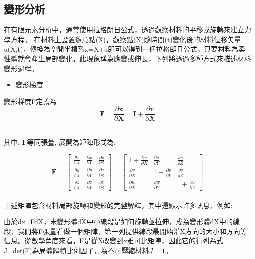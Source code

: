 \subsection{變形分析}

在有限元素分析中，通常使用拉格朗日公式，透過觀察材料的平移或旋轉來建立力學方程。
在材料上設置隨意點(X)，觀察點(X)隨時間(t)變化後的材料位移矢量u(X,t)，轉換為空間坐標系x=X+u即可以得到一個拉格朗日公式，只要材料為柔性體就會產生局部變化，此現象稱為應變或伸長，下列將透過多種方式來描述材料變形過程。\\

\begin{itemize}
\item 變形梯度
\end{itemize}

變形梯度F定義為
$$\mathbf{F}=\frac{\partial \mathbf{x}}{\partial \mathbf{X}}=\mathbf{I}+\frac{\partial \mathbf{u}}{\partial \mathbf{X}}$$\

其中, $\mathbf{I}$ 等同張量, 展開為矩陣形式為:\

$$\mathbf{F}=\left[\begin{array}{lll}
\frac{\partial x}{\partial X} & \frac{\partial x}{\partial Y} & \frac{\partial x}{\partial Z} \\
\frac{\partial y}{\partial X} & \frac{\partial y}{\partial Y} & \frac{\partial y}{\partial Z} \\
\frac{\partial z}{\partial X} & \frac{\partial z}{\partial Y} & \frac{\partial z}{\partial Z}
\end{array}\right]=\left[\begin{array}{ccc}
1+\frac{\partial u}{\partial X} & \frac{\partial u}{\partial Y} & \frac{\partial u}{\partial Z} \\
\frac{\partial v}{\partial X} & 1+\frac{\partial v}{\partial Y} & \frac{\partial v}{\partial Z} \\
\frac{\partial w}{\partial X} & \frac{\partial w}{\partial Y} & 1+\frac{\partial w}{\partial Z}
\end{array}\right]$$
\\

上述矩陣包含材料局部旋轉和變形的完整解釋，其中還顯示許多訊息，例如:\

由於dx=FdX，未變形體dX中小線段是如何旋轉並拉伸，成為變形體dX中的線段，我們將F張量看做一個矩陣，第一列提供線段最開始沿X方向的大小和方向等信息。從數學角度來看，F是從X改變到x雅可比矩陣，因此它的行列為式J=det(F)為局體體積比例因子，為不可壓縮材料$J=1$。\\

